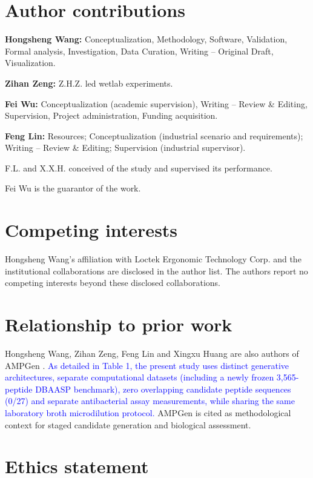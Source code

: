 \documentclass[unnumsec,webpdf,contemporary,large]{oup-authoring-template}
\newcommand{\rev}[1]{\textcolor{blue}{#1}}
\begin{document}
\section*{Author contributions}

\textbf{Hongsheng Wang:} Conceptualization, Methodology, Software, Validation, Formal analysis, Investigation, Data Curation, Writing -- Original Draft, Visualization.

\textbf{Zihan Zeng:} Z.H.Z. led wetlab experiments.

\textbf{Fei Wu:} Conceptualization (academic supervision), Writing -- Review \& Editing, Supervision, Project administration, Funding acquisition.

\textbf{Feng Lin:} Resources; Conceptualization (industrial scenario and requirements); Writing -- Review \& Editing; Supervision (industrial supervisor).

F.L. and X.X.H. conceived of the study and supervised its performance.

Fei Wu is the guarantor of the work.

\section*{Competing interests}

Hongsheng Wang's affiliation with Loctek Ergonomic Technology Corp. and the institutional collaborations are disclosed in the author list. The authors report no competing interests beyond these disclosed collaborations.

\section*{Relationship to prior work}
Hongsheng Wang, Zihan Zeng, Feng Lin and Xingxu Huang are also authors of AMPGen \cite{ref9}. \rev{As detailed in Table 1, the present study uses distinct generative architectures, separate computational datasets (including a newly frozen 3,565-peptide DBAASP benchmark), zero overlapping candidate peptide sequences (0/27) and separate antibacterial assay measurements, while sharing the same laboratory broth microdilution protocol.} AMPGen is cited as methodological context for staged candidate generation and biological assessment.

\section*{Ethics statement}
\end{document}
